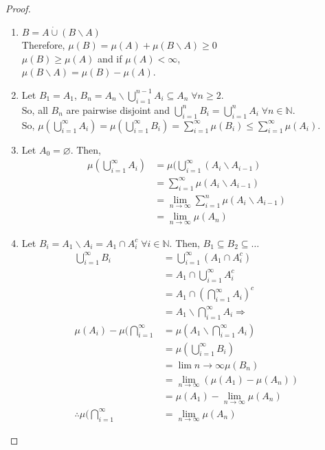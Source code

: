 \documentclass{article}
\begin{document}
\begin{myprop}{}{}
		\begin{proof}~\\
		\begin{enumerate}
			\item $B=A\dot\cup(B\backslash A)$\\
			Therefore, $\mu(B)=\mu(A)+\mu(B\backslash A)\geq0$\\
			$\mu(B)\geq\mu(A)$ and if $\mu(A)<\infty$,\\
			$\mu(B\backslash A)=\mu(B)-\mu(A)$.
			\item Let $B_1=A_1$, $B_n=A_n\backslash \bigcup_{i=1}^{n-1}A_i\subseteq A_n\;\forall n\geq2$.\\
			So, all $B_n$ are pairwise disjoint and $\bigcup_{i=1}^{n}B_i=\bigcup_{i=1}^{n}A_i\;\forall n\in\mathbb{N}$.\\
			So, $\mu(\bigcup_{i=1}^{\infty}A_i)=\mu(\bigcup_{i=1}^{\infty}B_i)=\sum_{i=1}^{\infty}\mu(B_i)\leq\sum_{i=1}^{\infty}\mu(A_i)$.
			\item Let $A_0=\varnothing$. Then,
			\begin{align*}
				\mu(\bigcup_{i=1}^{\infty}A_i)&=\mu(\bigcup_{i=1}^{\infty}(A_i\backslash A_{i-1})\\
				&=\sum_{i=1}^{\infty}\mu(A_i\backslash A_{i-1})\\
				&=\lim_{n\to\infty}\sum_{i=1}^{n}\mu(A_i\backslash A_{i-1})\\
				&=\lim_{n\to\infty}\mu(A_n)
			\end{align*}
			\item Let $B_i=A_1\backslash A_i=A_1\cap A_i^c\;\forall i\in\mathbb{N}$. Then, $B_1\subseteq B_2\subseteq\dots$
			\begin{align*}
				\bigcup_{i=1}^{\infty}B_i&=\bigcup_{i=1}^{\infty}(A_1\cap A_i^c)\\
				&=A_1\cap\bigcup_{i=1}^{\infty}A_i^c\\
				&=A_1\cap(\bigcap_{i=1}^{\infty}A_i)^c\\
				&=A_1\backslash\bigcap_{i=1}^{\infty}A_i\Rightarrow\\
				\mu(A_i)-\mu(\bigcap_{i=1}^{\infty}&=\mu(A_1\backslash\bigcap_{i=1}^{\infty}A_i)\\
				&=\mu(\bigcup_{i=1}^{\infty}B_i)\\
				&=\lim{n\to\infty}\mu(B_n)\\
				&=\lim_{n\to\infty}(\mu(A_1)-\mu(A_n))\\
				&=\mu(A_1)-\lim_{n\to\infty}\mu(A_n)\\
				\therefore\mu(\bigcap_{i=1}^{\infty}&=\lim_{n\to\infty}\mu(A_n)
			\end{align*}
			
		\end{enumerate}
	\end{proof}
	\end{myprop}
	
\end{document}
